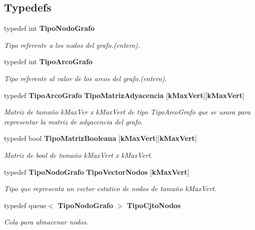 \subsection*{Typedefs}
\begin{CompactItemize}
\item 
typedef int {\bf TipoNodoGrafo}
\begin{CompactList}\small\item\em Tipo referente a los nodos del grafo.(entero). \item\end{CompactList}\item 
typedef int {\bf TipoArcoGrafo}
\begin{CompactList}\small\item\em Tipo referente al valor de los arcos del grafo.(entero). \item\end{CompactList}\item 
typedef {\bf TipoArcoGrafo} {\bf TipoMatrizAdyacencia} [{\bf kMaxVert}][{\bf kMaxVert}]
\begin{CompactList}\small\item\em Matriz de tamaño kMaxVer x kMaxVert de tipo TipoArcoGrafo que se usara para representar la matriz de adyacencia del grafo. \item\end{CompactList}\item 
typedef bool {\bf TipoMatrizBooleana} [{\bf kMaxVert}][{\bf kMaxVert}]
\begin{CompactList}\small\item\em Matriz de bool de tamaño kMaxVert x kMaxVert. \item\end{CompactList}\item 
typedef {\bf TipoNodoGrafo} {\bf TipoVectorNodos} [{\bf kMaxVert}]
\begin{CompactList}\small\item\em Tipo que representa un vector estatico de nodos de tamaño kMaxVert. \item\end{CompactList}\item 
typedef queue$<$ {\bf TipoNodoGrafo} $>$ {\bf TipoCjtoNodos}
\begin{CompactList}\small\item\em Cola para almacenar nodos. \item\end{CompactList}\end{CompactItemize}
